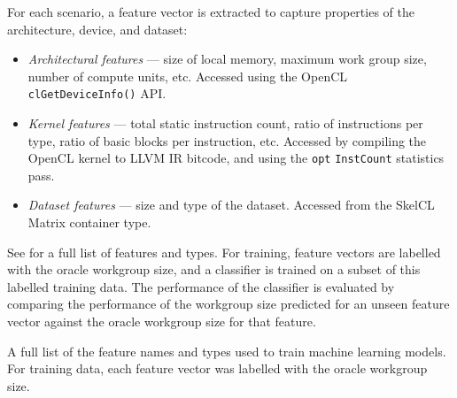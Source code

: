 For each scenario, a feature vector is extracted to capture properties
of the architecture, device, and dataset:

\begin{itemize}
\item \emph{Architectural features} --- size of local memory, maximum
  work group size, number of compute units, etc. Accessed using the
  OpenCL \texttt{clGetDeviceInfo()} API.
\item \emph{Kernel features} --- total static instruction count, ratio
  of instructions per type, ratio of basic blocks per instruction,
  etc. Accessed by compiling the OpenCL kernel to LLVM IR bitcode, and
  using the \texttt{opt} \texttt{InstCount} statistics pass.
\item \emph{Dataset features} --- size and type of the
  dataset. Accessed from the SkelCL Matrix container type.
\end{itemize}

See  for a full list of features and types. For
training, feature vectors are labelled with the oracle workgroup size,
and a classifier is trained on a subset of this labelled training
data. The performance of the classifier is evaluated by comparing the
performance of the workgroup size predicted for an unseen feature
vector against the oracle workgroup size for that feature.

A full list of the feature names and types used to train machine
learning models. For training data, each feature vector was labelled
with the oracle workgroup size.

